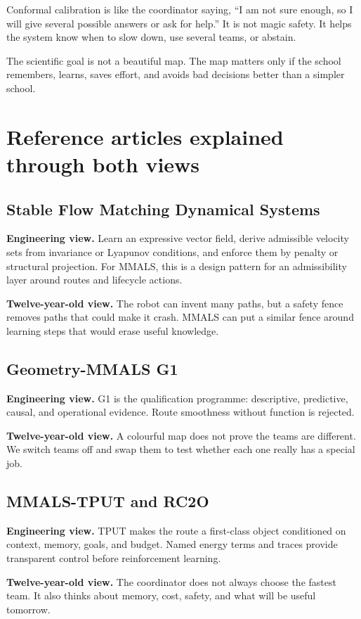 \documentclass[11pt,a4paper]{article}
\begin{document}
Conformal calibration is like the coordinator saying, ``I am not sure enough, so I will give several possible answers or ask for help.'' It is not magic safety. It helps the system know when to slow down, use several teams, or abstain.

The scientific goal is not a beautiful map. The map matters only if the school remembers, learns, saves effort, and avoids bad decisions better than a simpler school.

\section{Reference articles explained through both views}
\subsection{Stable Flow Matching Dynamical Systems}
\textbf{Engineering view.} Learn an expressive vector field, derive admissible velocity sets from invariance or Lyapunov conditions, and enforce them by penalty or structural projection. For MMALS, this is a design pattern for an admissibility layer around routes and lifecycle actions.

\textbf{Twelve-year-old view.} The robot can invent many paths, but a safety fence removes paths that could make it crash. MMALS can put a similar fence around learning steps that would erase useful knowledge.

\subsection{Geometry-MMALS G1}
\textbf{Engineering view.} G1 is the qualification programme: descriptive, predictive, causal, and operational evidence. Route smoothness without function is rejected.

\textbf{Twelve-year-old view.} A colourful map does not prove the teams are different. We switch teams off and swap them to test whether each one really has a special job.

\subsection{MMALS-TPUT and RC2O}
\textbf{Engineering view.} TPUT makes the route a first-class object conditioned on context, memory, goals, and budget. Named energy terms and traces provide transparent control before reinforcement learning.

\textbf{Twelve-year-old view.} The coordinator does not always choose the fastest team. It also thinks about memory, cost, safety, and what will be useful tomorrow.
\end{document}
